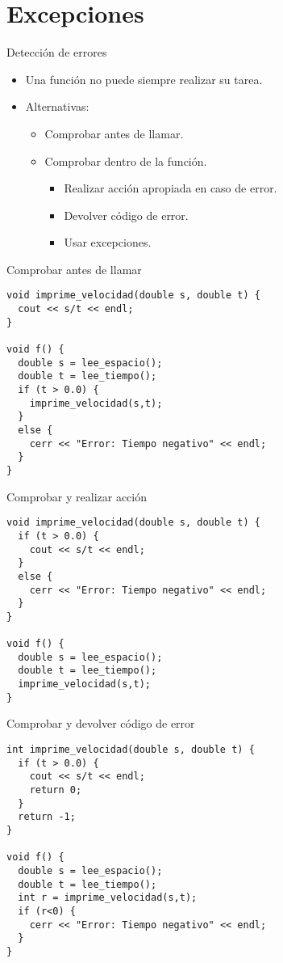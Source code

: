 \section{Excepciones}

\begin{frame}[fragile]{Detección de errores}
\begin{itemize}
  \item Una función no puede siempre realizar su tarea.
  \item Alternativas:
    \begin{itemize}
      \item Comprobar antes de llamar.
      \item Comprobar dentro de la función.
        \begin{itemize}
          \item Realizar acción apropiada en caso de error.
          \item Devolver código de error.
          \item Usar excepciones.
        \end{itemize}
    \end{itemize}
\end{itemize}
\end{frame}

\begin{frame}[fragile]{Comprobar antes de llamar}
\begin{lstlisting}
void imprime_velocidad(double s, double t) {
  cout << s/t << endl;
}

void f() {
  double s = lee_espacio();
  double t = lee_tiempo();
  if (t > 0.0) {
    imprime_velocidad(s,t);
  }
  else {
    cerr << "Error: Tiempo negativo" << endl;
  }
}
\end{lstlisting}
\end{frame}

\begin{frame}[fragile]{Comprobar y realizar acción}
\begin{lstlisting}
void imprime_velocidad(double s, double t) {
  if (t > 0.0) {
    cout << s/t << endl;
  }
  else {
    cerr << "Error: Tiempo negativo" << endl;
  }
}

void f() {
  double s = lee_espacio();
  double t = lee_tiempo();
  imprime_velocidad(s,t);
}
\end{lstlisting}
\end{frame}

\begin{frame}[fragile]{Comprobar y devolver código de error}
\begin{lstlisting}
int imprime_velocidad(double s, double t) {
  if (t > 0.0) {
    cout << s/t << endl;
    return 0;
  }
  return -1;
}

void f() {
  double s = lee_espacio();
  double t = lee_tiempo();
  int r = imprime_velocidad(s,t);
  if (r<0) {
    cerr << "Error: Tiempo negativo" << endl;
  }
}
\end{lstlisting}
\end{frame}

